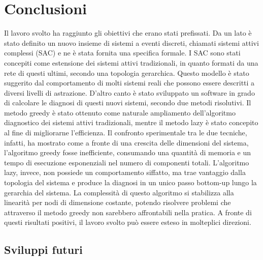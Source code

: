 \chapter{Conclusioni}
Il lavoro svolto ha raggiunto gli obiettivi che erano stati prefissati.
Da un lato è stato definito un nuovo insieme di sistemi a eventi discreti, chiamati sistemi attivi complessi (SAC) e ne è stata fornita una specifica formale. I SAC sono stati concepiti come estensione dei sistemi attivi tradizionali, in quanto formati da una rete di questi ultimi, secondo una topologia gerarchica. Questo modello è stato suggerito dal comportamento di molti sistemi reali che possono essere descritti a diversi livelli di astrazione. 
D'altro canto è stato sviluppato un software in grado di calcolare le diagnosi di questi nuovi sistemi, secondo due metodi risolutivi. Il metodo greedy è stato ottenuto come naturale ampliamento dell'algoritmo diagnostico dei sistemi attivi tradizionali, mentre il metodo lazy è stato concepito al fine di migliorarne l'efficienza. Il confronto sperimentale tra le due tecniche, infatti, ha mostrato come a fronte di una crescita delle dimensioni del sistema, l'algoritmo greedy fosse inefficiente, consumando una quantità di memoria e un tempo di esecuzione esponenziali nel numero di componenti totali. L'algoritmo lazy, invece, non possiede un comportamento siffatto, ma trae vantaggio dalla topologia del sistema e produce la diagnosi in un unico passo bottom-up lungo la gerarchia del sistema. La complessità di questo algoritmo si stabilizza alla linearità per nodi di dimensione costante, potendo risolvere problemi che attraverso il metodo greedy non sarebbero affrontabili nella pratica.
A fronte di questi risultati positivi, il lavoro svolto può essere esteso in molteplici direzioni.

\newpage
\section{Sviluppi futuri}

